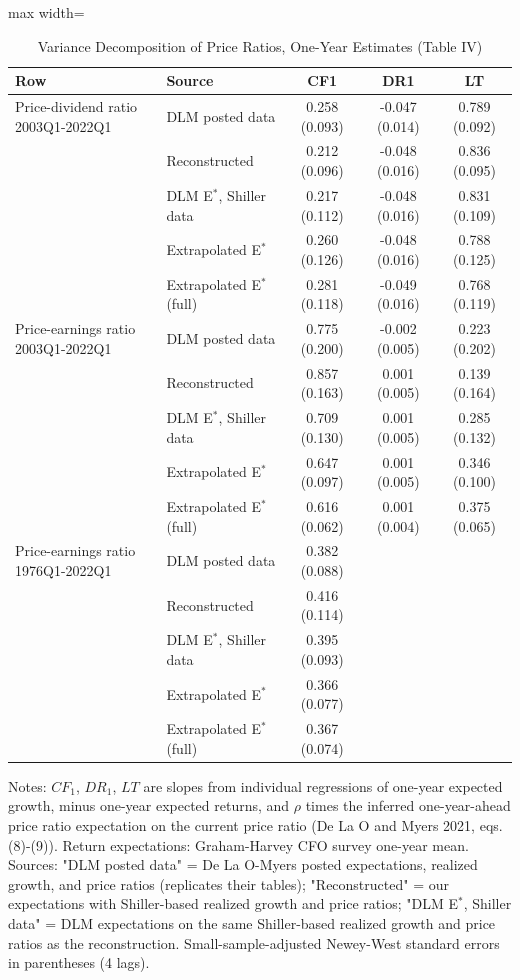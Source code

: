 \documentclass[11pt]{article}
\begin{document}
\begin{table}[H]
\centering
\caption{Variance Decomposition of Price Ratios, One-Year Estimates (Table IV)}
\label{tab:t4}
\small
\begin{adjustbox}{max width=\textwidth}
\begin{tabular}{llccc}
\toprule
Row & Source & CF1 & DR1 & LT \\
\midrule
Price-dividend ratio  2003Q1-2022Q1 & DLM posted data & 0.258 (0.093) & -0.047 (0.014) & 0.789 (0.092) \\
 & Reconstructed & 0.212 (0.096) & -0.048 (0.016) & 0.836 (0.095) \\
 & DLM E$^*$, Shiller data & 0.217 (0.112) & -0.048 (0.016) & 0.831 (0.109) \\
 & Extrapolated E$^*$ & 0.260 (0.126) & -0.048 (0.016) & 0.788 (0.125) \\
 & Extrapolated E$^*$ (full) & 0.281 (0.118) & -0.049 (0.016) & 0.768 (0.119) \\
\addlinespace
Price-earnings ratio  2003Q1-2022Q1 & DLM posted data & 0.775 (0.200) & -0.002 (0.005) & 0.223 (0.202) \\
 & Reconstructed & 0.857 (0.163) & 0.001 (0.005) & 0.139 (0.164) \\
 & DLM E$^*$, Shiller data & 0.709 (0.130) & 0.001 (0.005) & 0.285 (0.132) \\
 & Extrapolated E$^*$ & 0.647 (0.097) & 0.001 (0.005) & 0.346 (0.100) \\
 & Extrapolated E$^*$ (full) & 0.616 (0.062) & 0.001 (0.004) & 0.375 (0.065) \\
\addlinespace
Price-earnings ratio  1976Q1-2022Q1 & DLM posted data & 0.382 (0.088) &  &  \\
 & Reconstructed & 0.416 (0.114) &  &  \\
 & DLM E$^*$, Shiller data & 0.395 (0.093) &  &  \\
 & Extrapolated E$^*$ & 0.366 (0.077) &  &  \\
 & Extrapolated E$^*$ (full) & 0.367 (0.074) &  &  \\
\bottomrule
\end{tabular}
\end{adjustbox}

\vspace{2pt}
{\footnotesize Notes: $CF_1$, $DR_1$, $LT$ are slopes from individual regressions of one-year expected growth, minus one-year expected returns, and $\rho$ times the inferred one-year-ahead price ratio expectation on the current price ratio (De La O and Myers 2021, eqs. (8)-(9)). Return expectations: Graham-Harvey CFO survey one-year mean. Sources: "DLM posted data" = De La O-Myers posted expectations, realized growth, and price ratios (replicates their tables); "Reconstructed" = our expectations with Shiller-based realized growth and price ratios; "DLM E$^*$, Shiller data" = DLM expectations on the same Shiller-based realized growth and price ratios as the reconstruction. Small-sample-adjusted Newey-West standard errors in parentheses (4 lags). }
\end{table}
\end{document}
